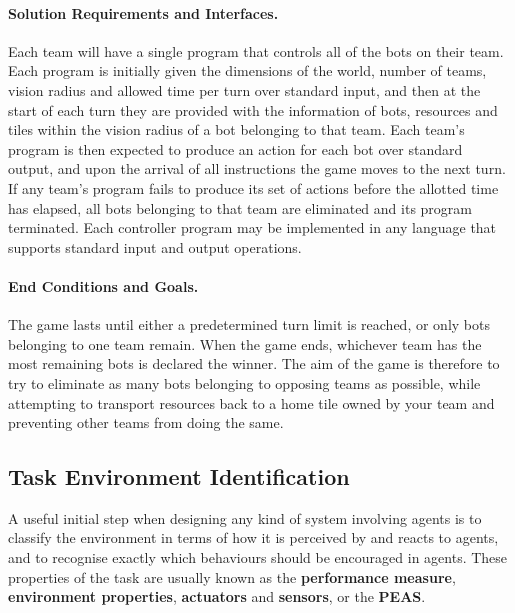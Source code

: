 \documentclass[a4paper,10pt]{article}
\begin{document}
\paragraph{Solution Requirements and Interfaces.}
Each team will have a single program that controls all of the bots on their team. Each program is initially given the dimensions of the world, number of teams, vision radius and allowed time per turn over standard input, and then at the start of each turn they are provided with the information of bots, resources and tiles within the vision radius of a bot belonging to that team. Each team's program is then expected to produce an action for each bot over standard output, and upon the arrival of all instructions the game moves to the next turn. If any team's program fails to produce its set of actions before the allotted time has elapsed, all bots belonging to that team are eliminated and its program terminated. Each controller program may be implemented in any language that supports standard input and output operations.

\paragraph{End Conditions and Goals.}
The game lasts until either a predetermined turn limit is reached, or only bots belonging to one team remain. When the game ends, whichever team has the most remaining bots is declared the winner. The aim of the game is therefore to try to eliminate as many bots belonging to opposing teams as possible, while attempting to transport resources back to a home tile owned by your team and preventing other teams from doing the same.

\subsection{Task Environment Identification}
A useful initial step when designing any kind of system involving agents is to classify the environment in terms of how it is perceived by and reacts to agents, and to recognise exactly which behaviours should be encouraged in agents. These properties of the task are usually known as the \textbf{performance measure}, \textbf{environment properties}, \textbf{actuators} and \textbf{sensors}, or the \textbf{PEAS}\cite{norvig10}.
\end{document}
